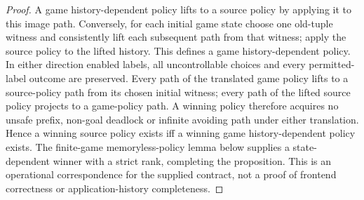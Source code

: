\begin{proof}
A game history-dependent policy lifts to a source policy by applying it to this image path. Conversely, for each initial game state choose one old-tuple witness and consistently lift each subsequent path from that witness; apply the source policy to the lifted history. This defines a game history-dependent policy. In either direction enabled labels, all uncontrollable choices and every permitted-label outcome are preserved. Every path of the translated game policy lifts to a source-policy path from its chosen initial witness; every path of the lifted source policy projects to a game-policy path. A winning policy therefore acquires no unsafe prefix, non-goal deadlock or infinite avoiding path under either translation. Hence a winning source policy exists iff a winning game history-dependent policy exists. The finite-game memoryless-policy lemma below supplies a state-dependent winner with a strict rank, completing the proposition. This is an operational correspondence for the supplied contract, not a proof of frontend correctness or application-history completeness.
\end{proof}
